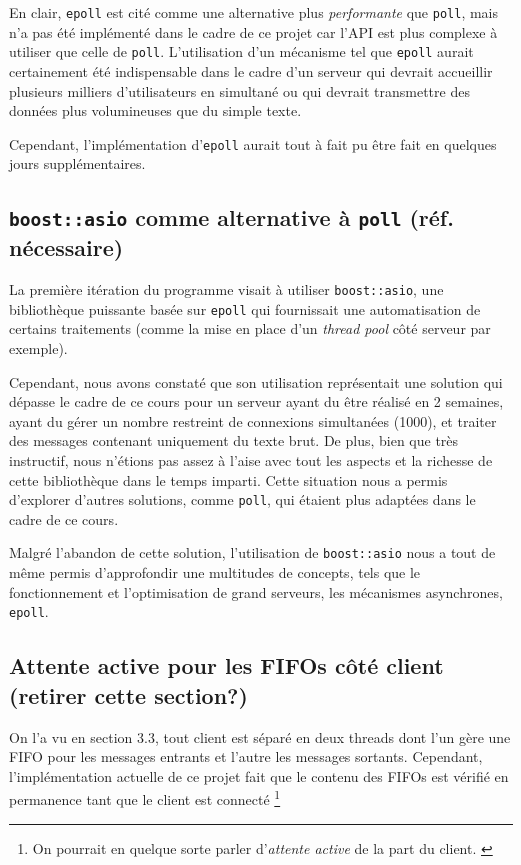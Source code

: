 \documentclass{article}
\begin{document}
\noindent En clair, \texttt{epoll} est cité comme une alternative plus \textit{performante} que \texttt{poll}, mais n'a pas été implémenté dans le cadre de ce projet car l'API est plus complexe à utiliser que celle de \texttt{poll}. L'utilisation d'un mécanisme tel que \texttt{epoll} aurait certainement été indispensable dans le cadre d'un serveur qui devrait accueillir plusieurs milliers d'utilisateurs en simultané ou qui devrait transmettre des données plus volumineuses que du simple texte.

Cependant, l'implémentation d'\texttt{epoll} aurait tout à fait pu être fait en quelques jours supplémentaires.

\subsection{\texttt{boost::asio} comme alternative à \texttt{poll} (réf. nécessaire)}
La première itération du programme visait à utiliser \texttt{boost::asio}, une bibliothèque puissante basée sur \texttt{epoll} qui fournissait une automatisation de certains traitements (comme la mise en place d'un \textit{thread pool} côté serveur par exemple).

\noindent Cependant, nous avons constaté que son utilisation représentait une solution qui dépasse le cadre de ce cours pour un serveur ayant du être réalisé en 2 semaines, ayant du gérer un nombre restreint de connexions simultanées (1000), et traiter des messages contenant uniquement du texte brut. De plus, bien que très instructif, nous n’étions pas assez à l’aise avec tout les aspects et la richesse de cette bibliothèque dans le temps imparti. Cette situation nous a permis d'explorer d’autres solutions, comme \texttt{poll}, qui étaient plus adaptées dans le cadre de ce cours.

\noindent Malgré l'abandon de cette solution, l’utilisation de \texttt{boost::asio} nous a tout de même permis d'approfondir une multitudes de concepts, tels que le fonctionnement et l'optimisation de grand serveurs, les mécanismes asynchrones, \texttt{epoll}.


\subsection{Attente active pour les FIFOs côté client (retirer cette section?)}
\noindent On l'a vu en section 3.3, tout client est séparé en deux threads dont l'un gère une FIFO pour les messages entrants et l'autre les messages sortants. Cependant, l'implémentation actuelle de ce projet fait que le contenu des FIFOs est vérifié en permanence tant que le client est connecté \footnote{On pourrait en quelque sorte parler d'\textit{attente active} de la part du client. \cite{Attente Active} }
\end{document}
